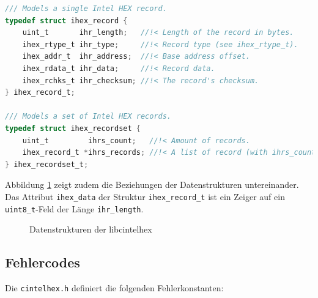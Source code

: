 \documentclass[11pt]{scrartcl}
\begin{document}
\begin{lstlisting}[language=C,morekeywords={uint\_t, ihex\_rtype\_t, ihex\_addr\_t, ihex\_rdata\_t, ihex\_rchks\_t, ihex\_record\_t, ihex\_recordset\_t}, caption=Definition der \texttt{ihex\_record\_t}- und \texttt{ihex\_recordset\_t}-Strukturen]
/// Models a single Intel HEX record.
typedef struct ihex_record {
	uint_t       ihr_length;   //!< Length of the record in bytes.
	ihex_rtype_t ihr_type;     //!< Record type (see ihex_rtype_t).
	ihex_addr_t  ihr_address;  //!< Base address offset.
	ihex_rdata_t ihr_data;     //!< Record data.
	ihex_rchks_t ihr_checksum; //!< The record's checksum.
} ihex_record_t;

/// Models a set of Intel HEX records.
typedef struct ihex_recordset {
	uint_t         ihrs_count;   //!< Amount of records.
	ihex_record_t *ihrs_records; //!< A list of record (with ihrs_count elements).
} ihex_recordset_t;
\end{lstlisting}

Abbildung \ref{lcih_datastructs} zeigt zudem die Beziehungen der Datenstrukturen untereinander. Das Attribut \texttt{ihex\_data} der Struktur \texttt{ihex\_record\_t} ist ein Zeiger auf ein \texttt{uint8\_t}-Feld der Länge \texttt{ihr\_length}.

\begin{figure}[!htb]
	\begin{center}
		
	\end{center}
	\caption{Datenstrukturen der libcintelhex}
	\label{lcih_datastructs}
\end{figure}

\subsection{Fehlercodes}

Die \texttt{cintelhex.h} definiert die folgenden Fehlerkonstanten:
\end{document}
